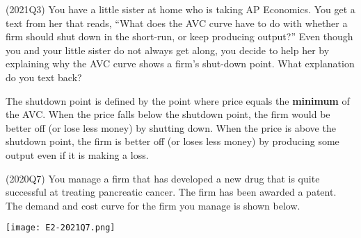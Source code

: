 \documentclass{exam}
\begin{document}
\begin{questions}
\question (2021Q3) You have a little sister at home who is taking AP Economics.  You get a text from her that reads, “What does the AVC curve have to do with whether a firm should shut down in the short-run, or keep producing output?”  Even though you and your little sister do not always get along, you decide to help her by explaining why the AVC curve shows a firm’s shut-down point.  What explanation do you text back?
\begin{solution} The shutdown point is defined by the point where price equals the \textbf{minimum} of the AVC. When the price falls below the shutdown point, the firm would be better off (or lose less money) by shutting down. When the price is above the shutdown point, the firm is better off (or loses less money) by producing some output even if it is making a loss.\end{solution}

\pagebreak
\question (2020Q7) You manage a firm that has developed a new drug that is quite successful at treating pancreatic cancer.  The firm has been awarded a patent.  The demand and cost curve for the firm you manage is shown below.

\texttt{[image: E2-2021Q7.png]}

\end{questions}
\end{document}
